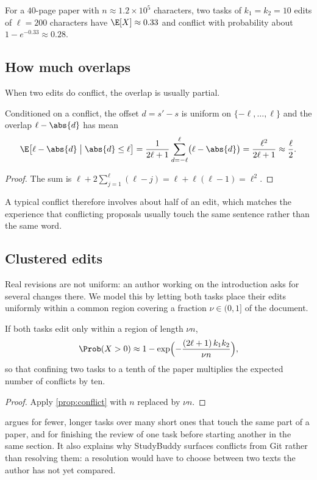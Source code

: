 For a $40$-page paper with $n \approx 1.2 \times 10^{5}$ characters, two tasks
of $k_1 = k_2 = 10$ edits of $\ell = 200$ characters have $\E[X] \approx 0.33$
and conflict with probability about $1 - e^{-0.33} \approx 0.28$.

\subsection{How much overlaps}

When two edits do conflict, the overlap is usually partial.

\begin{proposition}
\label{prop:overlap}
Conditioned on a conflict, the offset $d = s' - s$ is uniform on
$\{-\ell, \dots, \ell\}$ and the overlap $\ell - \abs{d}$ has mean
\begin{equation}
  \E\bigl[\ell - \abs{d} \bigm| \abs{d} \le \ell\bigr]
  = \frac{1}{2\ell + 1} \sum_{d=-\ell}^{\ell} \bigl(\ell - \abs{d}\bigr)
  = \frac{\ell^{2}}{2\ell + 1}
  \approx \frac{\ell}{2} .
  \label{eq:overlap}
\end{equation}
\end{proposition}

\begin{proof}
The sum is $\ell + 2\sum_{j=1}^{\ell} (\ell - j) = \ell + \ell(\ell - 1) = \ell^2$.
\end{proof}

A typical conflict therefore involves about half of an edit, which matches the
experience that conflicting proposals usually touch the same sentence rather
than the same word.

\subsection{Clustered edits}

Real revisions are not uniform: an author working on the introduction asks for
several changes there. We model this by letting both tasks place their edits
uniformly within a common region covering a fraction $\nu \in (0, 1]$ of the
document.

\begin{corollary}
\label{cor:clustered}
If both tasks edit only within a region of length $\nu n$,
\begin{equation}
  \Prob(X > 0) \approx 1 - \exp\Bigl(-\frac{(2\ell+1)\, k_1 k_2}{\nu n}\Bigr),
  \label{eq:clustered}
\end{equation}
so that confining two tasks to a tenth of the paper multiplies the expected
number of conflicts by ten.
\end{corollary}

\begin{proof}
Apply \cref{prop:conflict} with $n$ replaced by $\nu n$.
\end{proof}

 argues for fewer, longer tasks over many short ones that
touch the same part of a paper, and for finishing the review of one task
before starting another in the same section. It also explains why StudyBuddy
surfaces conflicts from Git rather than resolving them: a resolution would
have to choose between two texts the author has not yet compared.
